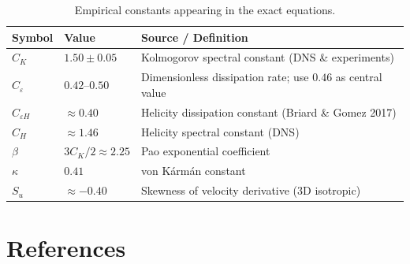 \documentclass[12pt,a4paper]{article}
\newcommand{\CK}{C_{K}}
\newcommand{\Ceps}{C_{\varepsilon}}
\newcommand{\CH}{C_{H}}
\newcommand{\CepsH}{C_{\varepsilon H}}
\theoremstyle{plain}
\theoremstyle{definition}
\begin{document}
\begin{table}[ht]
\centering
\caption{Empirical constants appearing in the exact equations.}
\label{tab:constants}
\renewcommand{\arraystretch}{1.4}
\begin{tabular}{@{}lll@{}}
  \toprule
  Symbol & Value & Source / Definition \\
  \midrule
  $\CK$    & $1.50 \pm 0.05$   & Kolmogorov spectral constant
                                  (DNS \& experiments) \\
  $\Ceps$  & $0.42$--$0.50$    & Dimensionless dissipation rate;
                                  use $0.46$ as central value \\
  $\CepsH$ & $\approx 0.40$    & Helicity dissipation constant
                                  (Briard \& Gomez 2017)\\
  $\CH$    & $\approx 1.46$    & Helicity spectral constant (DNS) \\
  $\beta$  & $3\CK/2 \approx 2.25$ & Pao exponential coefficient \\
  $\kappa$ & $0.41$            & von K\'arm\'an constant \\
  $S_u$    & $\approx -0.40$   & Skewness of velocity derivative
                                  (3D isotropic) \\
  \bottomrule
\end{tabular}
\end{table}

\section*{References}
\end{document}
